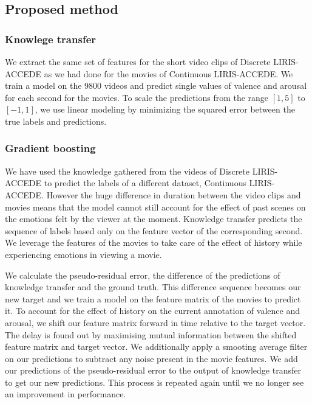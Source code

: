 \documentclass{article}
\begin{document}
\subsection{Proposed method}

\subsubsection{Knowlege transfer}
We extract the same set of features for the short video clips of Discrete LIRIS-ACCEDE as we had done for the movies of Continuous LIRIS-ACCEDE. We train a model on the 9800 videos and predict single values of valence and arousal for each second for the movies. To scale the predictions from the range $[1,5]$ to $[-1,1]$, we use linear modeling by minimizing the squared error between the true labels and predictions. 

\subsubsection{Gradient boosting}
We have used the knowledge gathered from the videos of Discrete LIRIS-ACCEDE to predict the labels of a different dataset, Continuous LIRIS-ACCEDE. However the huge difference in duration between the video clips and movies means that the model cannot still account for the effect of past scenes on the emotions felt by the viewer at the moment. Knowledge transfer predicts the sequence of labels based only on the feature vector of the corresponding second. We leverage the features of the movies to take care of the effect of history while experiencing emotions in viewing a movie.

We calculate the pseudo-residual error, the difference of the predictions of knowledge transfer and the ground truth. This difference sequence becomes our new target and we train a model on the feature matrix of the movies to predict it. To account for the effect of history on the current annotation of valence and arousal, we shift our feature matrix forward in time relative to the target vector. The delay is found out by maximising mutual information between the shifted feature matrix and target vector. We additionally apply a smooting average filter on our predictions to subtract any noise present in the movie features. We add our predictions of the pseudo-residual error to the output of knowledge transfer to get our new predictions. This process is repeated again until we no longer see an improvement in performance.
\end{document}
